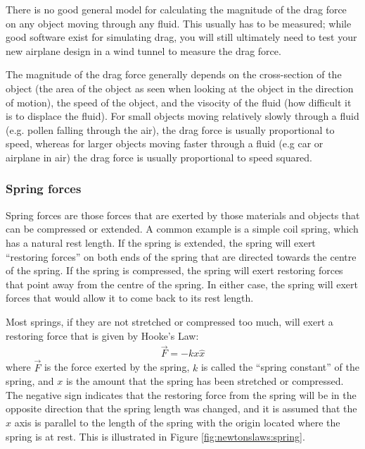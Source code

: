 There is no good general model for calculating the magnitude of the drag force on any object moving through any fluid. This usually has to be measured; while good software exist for simulating drag, you will still ultimately need to test your new airplane design in a wind tunnel to measure the drag force.

 The magnitude of the drag force generally depends on the cross-section of the object (the area of the object as seen when looking at the object in the direction of motion), the speed of the object, and the visocity of the fluid (how difficult it is to displace the fluid). For small objects moving relatively slowly through a fluid (e.g. pollen falling through the air), the drag force is usually proportional to speed, whereas for larger objects moving faster through a fluid (e.g car or airplane in air) the drag force is usually proportional to speed squared.

\subsubsection{Spring forces}
Spring forces are those forces that are exerted by those materials and objects that can be compressed or extended. A common example is a simple coil spring, which has a natural rest length. If the spring is extended, the spring will exert ``restoring forces'' on both ends of the spring that are directed towards the centre of the spring. If the spring is compressed, the spring will exert restoring forces that point away from the centre of the spring. In either case, the spring will exert forces that would allow it to come back to its rest length.

Most springs, if they are not stretched or compressed too much, will exert a restoring force that is given by Hooke's Law:
\begin{align*}
\vec F = -kx \hat x
\end{align*}
where $\vec F$ is the force exerted by the spring, $k$ is called the ``spring constant'' of the spring, and $x$ is the amount that the spring has been stretched or compressed. The negative sign indicates that the restoring force from the spring will be in the opposite direction that the spring length was changed, and it is assumed that the $x$ axis is parallel to the length of the spring with the origin located where the spring is at rest. This is illustrated in Figure \ref{fig:newtonslaws:spring}.



